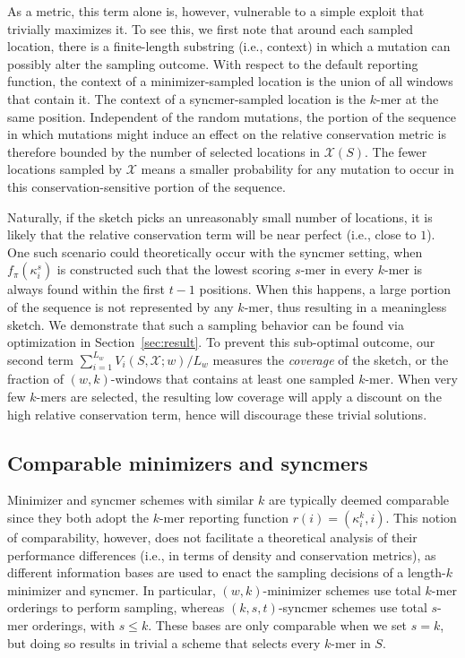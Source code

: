\vspace{-1mm}
As a metric, this term alone is, however, vulnerable to a simple exploit that trivially maximizes it. To see this, we first note that around each sampled location, there is a finite-length substring (i.e., context) in which a mutation can possibly alter the sampling outcome. With respect to the default reporting function, the context of a minimizer-sampled location is the union of all windows that contain it. The context of a syncmer-sampled location is the $k$-mer at the same position. Independent of the random mutations, the portion of the sequence in which mutations might induce an effect on the relative conservation metric is therefore bounded by the number of selected locations in $\mathcal{X}(S)$. The fewer locations sampled by $\mathcal{X}$ means a smaller probability for any mutation to occur in this conservation-sensitive portion of the sequence. 

Naturally, if the sketch picks an unreasonably small number of locations, it is likely that the relative conservation term will be near perfect (i.e., close to $1$). One such scenario could theoretically occur with the syncmer setting, when $f_\pi(\kappa^s_i)$ is constructed such that the lowest scoring $s$-mer in every $k$-mer is always found within the first $t-1$ positions. When this happens, a large portion of the sequence is not represented by any $k$-mer, thus resulting in a meaningless sketch. We demonstrate that such a sampling behavior can be found via optimization in Section~\ref{sec:result}. To prevent this sub-optimal outcome, our second term $\sum_{i=1}^{L_w} V_i(S, \mathcal{X}; w)/L_w$ measures the \textit{coverage} of the sketch, or the fraction of $(w,k)$-windows that contains at least one sampled $k$-mer. When very few $k$-mers are selected, the resulting low coverage will apply a discount on the high relative conservation term, hence will discourage these trivial solutions.

\vspace{-3mm}
\subsection{Comparable minimizers and syncmers}
\label{sec:comparability}
Minimizer and syncmer schemes with similar $k$ are typically deemed comparable~\cite{edgar2021syncmers,shaw2021theory} since they both adopt the $k$-mer reporting function $r(i)=(\kappa^k_i, i)$. This notion of comparability, however, does not facilitate a theoretical analysis of their performance differences (i.e., in terms of density and conservation metrics), as different information bases are used to enact the sampling decisions of a length-$k$ minimizer and syncmer. In particular, $(w, k)$-minimizer schemes use total $k$-mer orderings to perform sampling, whereas $(k, s, t)$-syncmer schemes use total $s$-mer orderings, with $s \leq k$. These bases are only comparable when we set $s=k$, but doing so results in trivial a scheme that selects every $k$-mer in $S$. 

